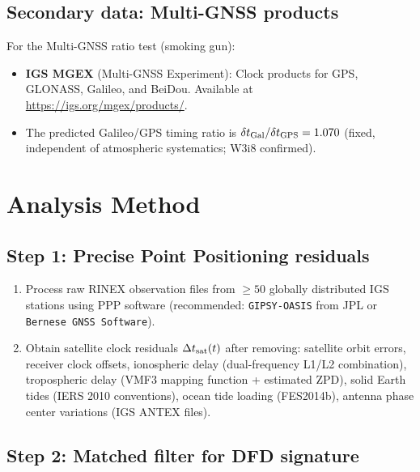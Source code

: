 \documentclass[11pt]{article}
\begin{document}
\subsection{Secondary data: Multi-GNSS products}

For the Multi-GNSS ratio test (smoking gun):
\begin{itemize}[nosep]
\item \textbf{IGS MGEX} (Multi-GNSS Experiment): Clock products for
  GPS, GLONASS, Galileo, and BeiDou. Available at
  \url{https://igs.org/mgex/products/}.
\item The predicted Galileo/GPS timing ratio is
  $\delta t_{\rm Gal}/\delta t_{\rm GPS} = 1.070$ (fixed, independent
  of atmospheric systematics; W3i8 confirmed).
\end{itemize}

\section{Analysis Method}

\subsection{Step 1: Precise Point Positioning residuals}

\begin{enumerate}[nosep]
\item Process raw RINEX observation files from $\geq 50$ globally
  distributed IGS stations using PPP software (recommended:
  \texttt{GIPSY-OASIS} from JPL or \texttt{Bernese GNSS Software}).
\item Obtain satellite clock residuals $\Delta t_{\rm sat}(t)$ after
  removing: satellite orbit errors, receiver clock offsets,
  ionospheric delay (dual-frequency L1/L2 combination), tropospheric
  delay (VMF3 mapping function + estimated ZPD), solid Earth tides
  (IERS 2010 conventions), ocean tide loading (FES2014b), antenna
  phase center variations (IGS ANTEX files).
\end{enumerate}

\subsection{Step 2: Matched filter for DFD signature}
\end{document}
